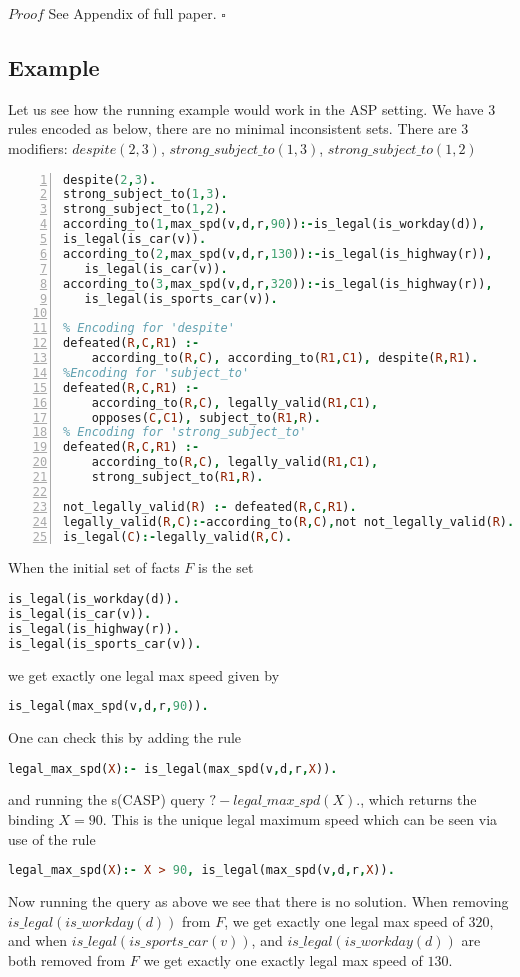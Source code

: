 $Proof$ See Appendix of full paper. $\square$


\subsection{Example}
Let us see how the running example would work in the ASP setting. We have 3 rules encoded as below, there are no minimal inconsistent sets. There are 3 modifiers: $despite(2,3)$,                           $strong\_subject\_to(1,3)$, $strong\_subject\_to(1,2)$
\begin{lstlisting}[language=Prolog, numbers=left]
despite(2,3).
strong_subject_to(1,3).
strong_subject_to(1,2).
according_to(1,max_spd(v,d,r,90)):-is_legal(is_workday(d)),
is_legal(is_car(v)).
according_to(2,max_spd(v,d,r,130)):-is_legal(is_highway(r)),
   is_legal(is_car(v)).
according_to(3,max_spd(v,d,r,320)):-is_legal(is_highway(r)),
   is_legal(is_sports_car(v)).

% Encoding for 'despite'
defeated(R,C,R1) :-
    according_to(R,C), according_to(R1,C1), despite(R,R1).
%Encoding for 'subject_to'
defeated(R,C,R1) :-
    according_to(R,C), legally_valid(R1,C1),
    opposes(C,C1), subject_to(R1,R).
% Encoding for 'strong_subject_to'
defeated(R,C,R1) :-
    according_to(R,C), legally_valid(R1,C1),
    strong_subject_to(R1,R).

not_legally_valid(R) :- defeated(R,C,R1).
legally_valid(R,C):-according_to(R,C),not not_legally_valid(R).
is_legal(C):-legally_valid(R,C).
\end{lstlisting}

When the initial set of facts $F$ is the set
\begin{lstlisting}[language=Prolog]
is_legal(is_workday(d)).
is_legal(is_car(v)).
is_legal(is_highway(r)).
is_legal(is_sports_car(v)).
\end{lstlisting}
we get exactly one legal max speed given by 
\begin{lstlisting}[language=Prolog]
is_legal(max_spd(v,d,r,90)).
\end{lstlisting}
One can check this by adding the rule 
\begin{lstlisting}[language=Prolog]
legal_max_spd(X):- is_legal(max_spd(v,d,r,X)). 
\end{lstlisting}
and running the s(CASP) query $?- legal\_max\_spd(X).$, which returns the binding $X = 90$. This is the unique legal maximum speed which can be seen via use of the rule 
\begin{lstlisting}[language=Prolog]
legal_max_spd(X):- X > 90, is_legal(max_spd(v,d,r,X)). 
\end{lstlisting}
Now running the query as above we see that there is no solution. 
When removing
$is\_legal(is\_workday(d))$ from $F$, we get exactly one legal max speed of $320$, and when  $is\_legal(is\_sports\_car(v))$, and $is\_legal(is\_workday(d))$ are both removed from $F$ we get exactly one exactly legal max speed of $130$.

